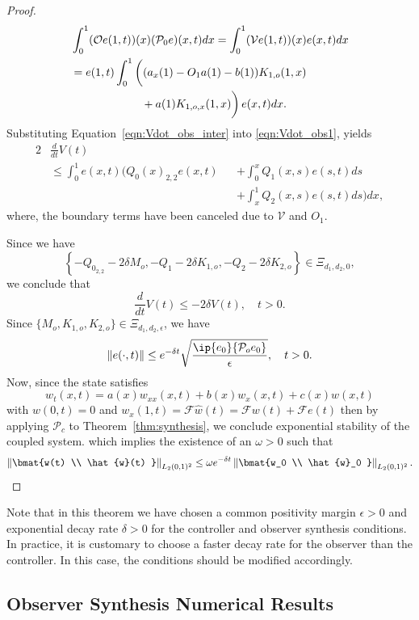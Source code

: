 \documentclass[9pt,journal,twocolumn]{IEEEtran}
\newcommand{\pfs}{\frac{\partial}{\partial s}}
\newcommand{\igzo}{\int_0^1}
\newcommand{\igzx}{\int_0^x}
\newcommand{\igxo}{\int_x^1}
\newcommand{\wh}{\hat{w}}
\newcommand{\lt}{L_2(0,1)}
\begin{document}
\begin{proof}
 \begin{align}
 &\igzo (\mathcal{O}e(1,t))(x) (\mathcal{P}_0e)(x,t)dx =  \igzo (\mathcal{V}e(1,t))(x) e(x,t)dx \nonumber \\
&= e(1,t) \igzo \left( \vphantom{\pfs}(a_x(1)-O_1a(1)-b(1))K_{1,o}(1,x) \right. \nonumber \\
&\label{eqn:Vdot_obs_inter}\left. \vphantom{\pfs}\qquad \qquad  \qquad   +a(1)K_{1,o,x}(1,x) \right) e(x,t)dx.
\end{align} Substituting Equation~\eqref{eqn:Vdot_obs_inter} into \eqref{eqn:Vdot_obs1}, yields
\begin{alignat*}{2}
 &\frac{d}{dt}V(t) \\
 &\leq \igzo e(x,t) \bigg(Q_0(x)_{2,2}e(x,t)&&+\igzx Q_1(x,s)e(s,t)ds  \\
 & &&+\igxo Q_2(x,s)e(s,t)ds    \bigg)dx,
\end{alignat*} where, the boundary terms have been canceled due to $\mathcal{V}$ and $O_1$.

Since we have
\[
\left\{-Q_{0_{2,2}}-2\delta M_o, -Q_1-2\delta K_{1,o}, -Q_2-2\delta K_{2,o} \right\} \in \Xi_{d_1,d_2,0},
\]
we conclude that
\[
 \frac{d}{dt}V(t) \leq -2  \delta V(t), \quad t>0.
\]
Since $\{M_o,K_{1,o},K_{2,o}\} \in \Xi_{d_1,d_2,\epsilon}$, we have
 \[
 \|e(\cdot,t)\| \leq e^{-\delta t} \sqrt{\frac{\ip{e_0}{\mathcal{P}_o e_0}}{\epsilon}}, \quad t>0.
 \]
Now, since the state satisfies
\begin{equation}
 w_t(x,t)\label{eqn:obs_coupled_2}=a(x)w_{xx}(x,t)+b(x)w_x(x,t)+c(x)w(x,t)
\end{equation}
with  $w(0,t)=0$ and $w_x(1,t)=\mathcal{F}\wh(t)=\mathcal{F} w(t) + \mathcal{F}e(t)$ then by applying $\mathcal{P}_c$ to Theorem~\ref{thm:synthesis}, we conclude exponential stability of the coupled system. which implies the existence of an $\omega > 0$ such that
\[
  \left\|\bmat{w(t) \\ \wh(t) }\right\|_{\lt^2} \leq \omega e^{-\delta t} \left\|\bmat{w_0 \\ \wh_0 }\right\|_{\lt^2}.
\]
\end{proof}
 Note that in this theorem we have chosen a common positivity margin $\epsilon>0$ and exponential decay rate $\delta>0$ for the controller and observer synthesis conditions. In practice, it is customary to choose a faster decay rate for the observer than the controller. In this case, the conditions should be modified accordingly.

\subsection{Observer Synthesis Numerical Results}
\end{document}
